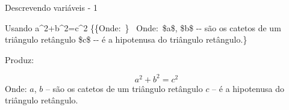 \begin{frame}{Descrevendo variáveis - 1}
	\begin{Codigo}{Usando \texttt{\string\parindent}}
		\LCmd{[}a\string^2+b\string^2=c\string^2\LCmd{]}
		\nn
		\{\{Onde:\string\ \}\n
		\string\noindent\ Onde:\string\ \$a\$, \$b\$ -{}- são os catetos de um triângulo retângulo\n\n
		\$c\$ -{}- é a hipotenusa do triângulo retângulo.\}
	\end{Codigo}

    \pause
	Produz:

	\begin{Resultado}{}
		\[a^2+b^2=c^2\]
		{\settowidth{\parindent}{Onde:\ }
\noindent Onde: $a$, $b$ -- são os catetos de um triângulo retângulo
		$c$ -- é a hipotenusa do triângulo retângulo.}
	\end{Resultado}
\end{frame}

